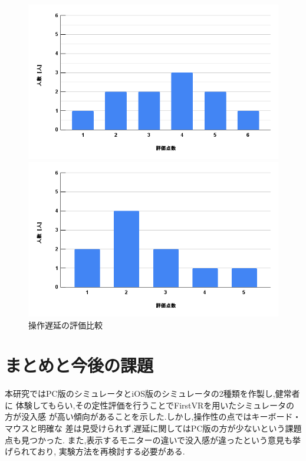 \documentclass{ltjsreport}
\begin{document}
		\begin{figure}[H]
		\centering
		\begin{minipage}{0.75\columnwidth}
		\centering
		\includegraphics[width = \columnwidth]{../figs/PC-3.png}
		\end{minipage}
		\hspace{0.04\columnwidth}
		\begin{minipage}{0.75\columnwidth}
		\centering
		\includegraphics[width = \columnwidth]{../figs/iOS-3.png}
		\end{minipage}
		\caption{操作遅延の評価比較}
		\end{figure}

\chapter{まとめと今後の課題}
	本研究ではPC版のシミュレータとiOS版のシミュレータの2種類を作製し,健常者に
	体験してもらい,その定性評価を行うことでFirstVRを用いたシミュレータの方が没入感
	が高い傾向があることを示した.しかし,操作性の点ではキーボード・マウスと明確な
	差は見受けられず,遅延に関してはPC版の方が少ないという課題点も見つかった.
	また,表示するモニターの違いで没入感が違ったという意見も挙げられており,
	実験方法を再検討する必要がある.
\end{document}
